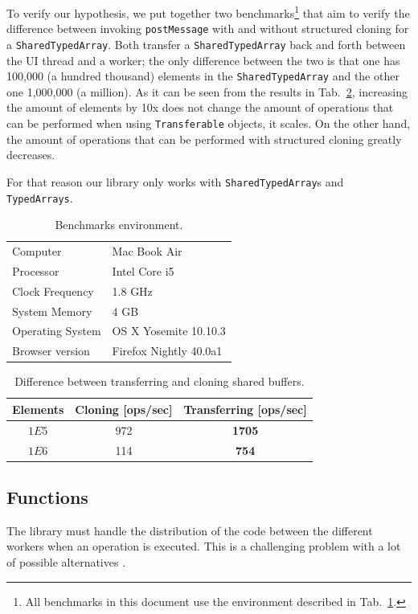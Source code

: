 \documentclass[runningheads,a4paper]{llncs}
\begin{document}
To verify our hypothesis, we put together two benchmarks\footnote{All benchmarks in this document use the environment described in Tab.~\ref{tab:env}.} that aim to verify the difference between invoking \verb+postMessage+ with and without structured cloning for a \verb+SharedTypedArray+. Both transfer a \verb+SharedTypedArray+ back and forth between the UI thread and a worker; the only difference between the two is that one has 100,000 (a hundred thousand) elements in the \verb+SharedTypedArray+ and the other one 1,000,000 (a million). As it can be seen from the  results in Tab.~\ref{tab:transf-vs-clone}, increasing the amount of elements by 10x does not change the amount of operations that can be performed when using \verb+Transferable+ objects, it scales. On the other hand, the amount of operations that can be performed with structured cloning greatly decreases.

For that reason our library only works with \verb+SharedTypedArray+s and \verb+TypedArrays+.

\begin{table}
  \centering
  \begin{tabular}{|l|l|}
    \hline
    Computer & Mac Book Air \\
    Processor & Intel Core i5 \\
    Clock Frequency & 1.8 GHz \\
    System Memory & 4 GB \\
    Operating System & OS X Yosemite 10.10.3 \\
    Browser version & Firefox Nightly 40.0a1 \\
    \hline
  \end{tabular}
  \caption{Benchmarks environment.}
  \label{tab:env}
\end{table}

\begin{table}
  \centering
  \begin{tabular}{|c|c|c|}
    \hline
    Elements & Cloning [ops/sec] & Transferring [ops/sec] \\
    \hline
    \(1E5\) & 972 & \textbf{1705} \\
    \(1E6\) & 114 & \textbf{754} \\
    \hline
  \end{tabular}
  \caption{Difference between transferring and cloning shared buffers.}
  \label{tab:transf-vs-clone}
\end{table}

\subsection{Functions}\label{sub-sec:functions}
The library must handle the distribution of the code between the different workers when an operation is executed. This is a challenging problem with a lot of possible alternatives \cite{cloud-haskell} \cite{distributed-scheme}.
\end{document}
